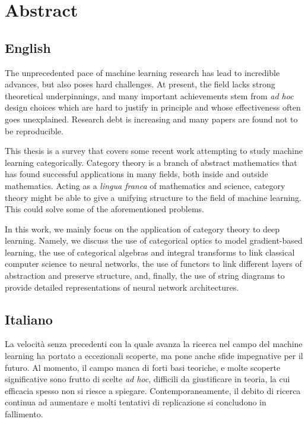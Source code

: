 \documentclass[11pt,a4paper,openright,twoside]{report}
\theoremstyle{plain}
\theoremstyle{definition}
\begin{document}

\chapter*{Abstract}   

\section*{English}

The unprecedented pace of machine learning research has lead to incredible advances, but also poses hard challenges. At present, the field lacks strong theoretical underpinnings, and many important achievements stem from \textit{ad hoc} design choices which are hard to justify in principle and whose effectiveness often goes unexplained. Research debt is increasing and many papers are found not to be reproducible. 

This thesis is a survey that covers some recent work attempting to study machine learning categorically. Category theory is a branch of abstract mathematics that has found successful applications in many fields, both inside and outside mathematics. Acting as a \textit{lingua franca} of mathematics and science, category theory might be able to give a unifying structure to the field of machine learning. This could solve some of the aforementioned problems. 

In this work, we mainly focus on the application of category theory to deep learning. Namely, we discuss the use of categorical optics to model gradient-based learning, the use of categorical algebras and integral transforms to link classical computer science to neural networks, the use of functors to link different layers of abstraction and preserve structure, and, finally, the use of string diagrams to provide detailed representations of neural network architectures.

\section*{Italiano}

La velocità senza precedenti con la quale avanza la ricerca nel campo del machine learning ha portato a eccezionali scoperte, ma pone anche sfide impegnative per il futuro.
Al momento, il campo manca di forti basi teoriche, e molte scoperte significative sono frutto di scelte \textit{ad hoc}, difficili da giustificare in teoria, la cui efficacia spesso non si riesce a spiegare. Contemporaneamente, il debito di ricerca continua ad aumentare e molti tentativi di replicazione si concludono in fallimento. 
\end{document}

